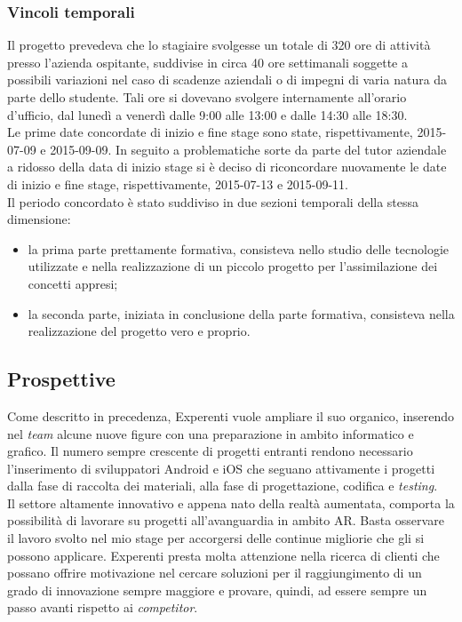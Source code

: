 \subsubsection{Vincoli temporali}
Il progetto prevedeva che lo stagiaire svolgesse un totale di 320 ore di attività presso l’azienda ospitante, suddivise in circa 40 ore settimanali soggette a possibili variazioni nel caso di scadenze aziendali o di impegni di varia natura da parte dello studente. Tali ore si dovevano svolgere internamente all’orario d’ufficio, dal lunedì a venerdì dalle 9:00 alle 13:00 e dalle 14:30 alle 18:30.
\\
Le prime date concordate di inizio e fine stage sono state, rispettivamente, 2015-07-09 e 2015-09-09. In seguito a problematiche sorte da parte del tutor aziendale a ridosso della data di inizio stage si \`e deciso di riconcordare nuovamente le date di inizio e fine stage, rispettivamente, 2015-07-13 e 2015-09-11. 
\\
Il periodo concordato \`e stato suddiviso in due sezioni temporali della stessa dimensione:
\begin{itemize}
	\item la prima parte prettamente formativa, consisteva nello studio delle tecnologie utilizzate e nella realizzazione di un piccolo progetto per l'assimilazione dei concetti appresi;
	\item la seconda parte, iniziata in conclusione della parte formativa, consisteva nella realizzazione del progetto vero e proprio.
\end{itemize}

\subsection{Prospettive}
Come descritto in precedenza, Experenti vuole ampliare il suo organico, inserendo nel \textit{team} alcune nuove figure con una preparazione in ambito informatico e grafico. Il numero sempre crescente di progetti entranti rendono necessario l'inserimento di sviluppatori Android e iOS che seguano attivamente i progetti dalla fase di raccolta dei materiali, alla fase di progettazione, codifica e \textit{testing}.
\\
Il settore altamente innovativo e appena nato della realt\`a aumentata, comporta la possibilit\`a di lavorare su progetti all'avanguardia in ambito AR. Basta osservare il lavoro svolto nel mio stage per accorgersi delle continue migliorie che gli si possono applicare. Experenti presta molta attenzione nella ricerca di clienti che possano offrire motivazione nel cercare soluzioni per il raggiungimento di un grado di innovazione sempre maggiore e provare, quindi, ad essere sempre un passo avanti rispetto ai \textit{competitor}.